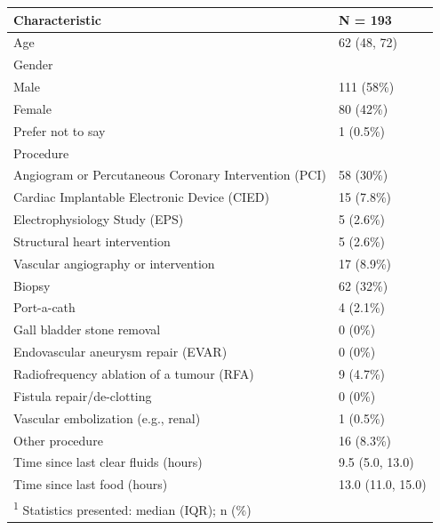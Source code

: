\documentclass[letterpaper,9pt,twocolumn,twoside,]{pinp}
\begin{document}
\begin{tabular}{ll}
\toprule
Characteristic & N = 193\\
\midrule
Age & 62 (48, 72)\\
Gender & \\
\hspace{1em}Male & 111 (58\%)\\
\hspace{1em}Female & 80 (42\%)\\
\hspace{1em}Prefer not to say & 1 (0.5\%)\\
\addlinespace
Procedure & \\
\hspace{1em}Angiogram or Percutaneous Coronary Intervention (PCI) & 58 (30\%)\\
\hspace{1em}Cardiac Implantable Electronic Device (CIED) & 15 (7.8\%)\\
\hspace{1em}Electrophysiology Study (EPS) & 5 (2.6\%)\\
\hspace{1em}Structural heart intervention & 5 (2.6\%)\\
\addlinespace
\hspace{1em}Vascular angiography or intervention & 17 (8.9\%)\\
\hspace{1em}Biopsy & 62 (32\%)\\
\hspace{1em}Port-a-cath & 4 (2.1\%)\\
\hspace{1em}Gall bladder stone removal & 0 (0\%)\\
\hspace{1em}Endovascular aneurysm repair (EVAR) & 0 (0\%)\\
\addlinespace
\hspace{1em}Radiofrequency ablation of a tumour (RFA) & 9 (4.7\%)\\
\hspace{1em}Fistula repair/de-clotting & 0 (0\%)\\
\hspace{1em}Vascular embolization (e.g., renal) & 1 (0.5\%)\\
\hspace{1em}Other procedure & 16 (8.3\%)\\
Time since last clear fluids (hours) & 9.5 (5.0, 13.0)\\
\addlinespace
Time since last food (hours) & 13.0 (11.0, 15.0)\\
\bottomrule
\multicolumn{2}{l}{\textsuperscript{1} Statistics presented: median (IQR); n (\%)}\\
\end{tabular}
\end{document}
